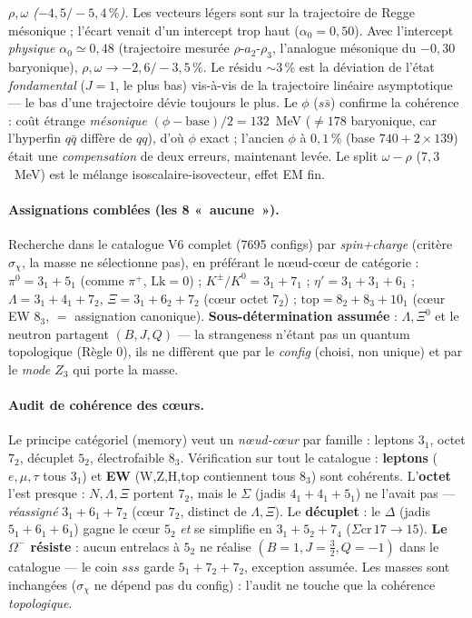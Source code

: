 \documentclass[11pt]{article}
\begin{document}
\emph{$\rho,\omega$ ($-4{,}5/-5{,}4\,\%$).} Les vecteurs légers sont sur la trajectoire de Regge mésonique ; l'écart venait d'un intercept trop haut ($\alpha_0{=}0{,}50$). Avec l'intercept \emph{physique} $\alpha_0\simeq0{,}48$ (trajectoire mesurée $\rho$-$a_2$-$\rho_3$, l'analogue mésonique du $-0{,}30$ baryonique), $\rho,\omega\to-2{,}6/-3{,}5\,\%$. Le résidu $\sim$3\,\% est la déviation de l'état \emph{fondamental} ($J{=}1$, le plus bas) vis-à-vis de la trajectoire linéaire asymptotique --- le bas d'une trajectoire dévie toujours le plus. Le $\phi$ ($s\bar s$) confirme la cohérence : coût étrange \emph{mésonique} $(\phi-\text{base})/2=132$~MeV ($\neq178$ baryonique, car l'hyperfin $q\bar q$ diffère de $qq$), d'où $\phi$ exact ; l'ancien $\phi$ à $0{,}1\,\%$ (base $740+2{\times}139$) était une \emph{compensation} de deux erreurs, maintenant levée. Le split $\omega-\rho$ ($7{,}3$~MeV) est le mélange isoscalaire-isovecteur, effet EM fin.

\paragraph{Assignations comblées (les 8 «~aucune~»).} Recherche dans le catalogue V6 complet (7695 configs) par \emph{spin+charge} (critère $\sigma_\chi$, la masse ne sélectionne pas), en préférant le nœud-cœur de catégorie : $\pi^0=3_1{+}5_1$ (comme $\pi^+$, $\mathrm{Lk}{=}0$) ; $K^\pm/K^0=3_1{+}7_1$ ; $\eta'=3_1{+}3_1{+}6_1$ ; $\Lambda=3_1{+}4_1{+}7_2$, $\Xi=3_1{+}6_2{+}7_2$ (cœur octet $7_2$) ; $\mathrm{top}=8_2{+}8_3{+}10_1$ (cœur EW $8_3$, $=$ assignation canonique). \textbf{Sous-détermination assumée} : $\Lambda,\Xi^0$ et le neutron partagent $(B,J,Q)$ --- la strangeness n'étant pas un quantum topologique (Règle 0), ils ne diffèrent que par le \emph{config} (choisi, non unique) et par le \emph{mode $Z_3$} qui porte la masse.

\paragraph{Audit de cohérence des cœurs.} Le principe catégoriel (memory) veut un \emph{nœud-cœur} par famille : leptons $3_1$, octet $7_2$, décuplet $5_2$, électrofaible $8_3$. Vérification sur tout le catalogue : \textbf{leptons} ($e,\mu,\tau$ tous $3_1$) et \textbf{EW} (W,Z,H,top contiennent tous $8_3$) sont cohérents. L'\textbf{octet} l'est presque : $N,\Lambda,\Xi$ portent $7_2$, mais le $\Sigma$ (jadis $4_1{+}4_1{+}5_1$) ne l'avait pas --- \emph{réassigné} $3_1{+}6_1{+}7_2$ (cœur $7_2$, distinct de $\Lambda,\Xi$). Le \textbf{décuplet} : le $\Delta$ (jadis $5_1{+}6_1{+}6_1$) gagne le cœur $5_2$ \emph{et} se simplifie en $3_1{+}5_2{+}7_4$ ($\Sigma\mathrm{cr}\,17\to15$). \textbf{Le $\Omega^-$ résiste} : aucun entrelacs à $5_2$ ne réalise $(B{=}1,J{=}\tfrac32,Q{=}{-}1)$ dans le catalogue --- le coin $sss$ garde $5_1{+}7_2{+}7_2$, exception assumée. Les masses sont inchangées ($\sigma_\chi$ ne dépend pas du config) : l'audit ne touche que la cohérence \emph{topologique}.
\end{document}
